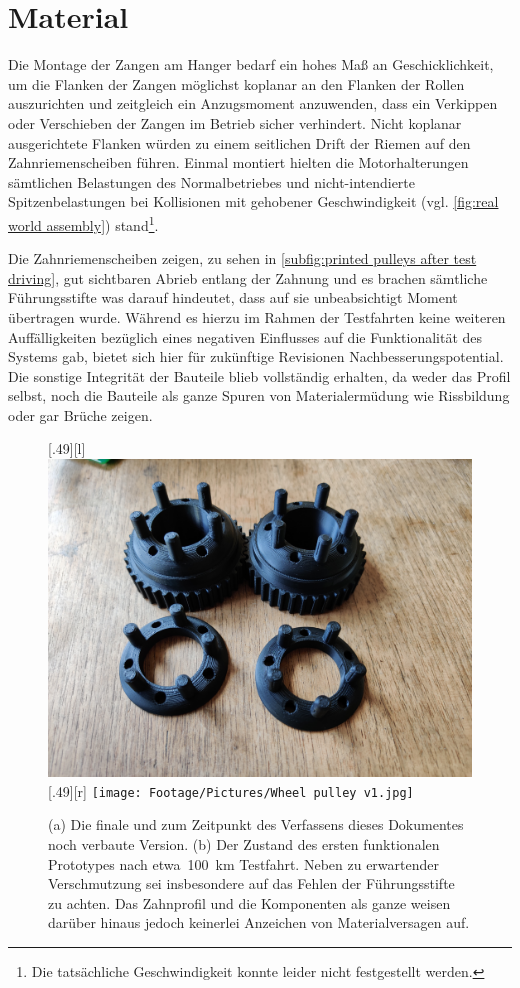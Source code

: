 	\section{Material}\label{sec:material}
		Die Montage der Zangen am Hanger bedarf ein hohes Maß an Geschicklichkeit, um die Flanken der Zangen möglichst koplanar an den Flanken der Rollen auszurichten und zeitgleich ein Anzugsmoment anzuwenden, dass ein Verkippen oder Verschieben der Zangen im Betrieb sicher verhindert.
		Nicht koplanar ausgerichtete Flanken würden zu einem seitlichen Drift der Riemen auf den Zahnriemenscheiben führen.
		Einmal montiert hielten die Motorhalterungen sämtlichen Belastungen des Normalbetriebes und nicht-intendierte Spitzenbelastungen bei Kollisionen mit gehobener Geschwindigkeit (vgl. \cref{fig:real world assembly}) stand\footnote{\hspace{1mm}Die tatsächliche Geschwindigkeit konnte leider nicht festgestellt werden.}.\par\medskip
		Die Zahnriemenscheiben zeigen, zu sehen in \cref{subfig:printed pulleys after test driving}, gut sichtbaren Abrieb entlang der Zahnung und es brachen sämtliche Führungsstifte was darauf hindeutet, dass auf sie unbeabsichtigt Moment übertragen wurde.
		Während es hierzu im Rahmen der Testfahrten keine weiteren Auffälligkeiten bezüglich eines negativen Einflusses auf die Funktionalität des Systems gab, bietet sich hier für zukünftige Revisionen Nachbesserungspotential.
		Die sonstige Integrität der Bauteile blieb vollständig erhalten, da weder das Profil selbst, noch die Bauteile als ganze Spuren von Materialermüdung wie Rissbildung oder gar Brüche zeigen.
		\begin{figure}[h]
			\centering
			[.49\textwidth][l]{
				\includegraphics[angle=180, width=.49\textwidth]{Footage/Pictures/Wheel pulley v2.jpg}
			}
			[.49\textwidth][r]{
				\texttt{[image: Footage/Pictures/Wheel pulley v1.jpg]}
			}
			\caption[Vergleich der gedruckten Zahn- und Konterscheiben vor und nach mehreren Testfahrten]{(a) Die finale und zum Zeitpunkt des Verfassens dieses Dokumentes noch verbaute Version. (b) Der Zustand des ersten funktionalen Prototypes nach etwa~\qty{100}{\kilo\metre} Testfahrt. Neben zu erwartender Verschmutzung sei insbesondere auf das Fehlen der Führungsstifte zu achten. Das Zahnprofil und die Komponenten als ganze weisen darüber hinaus jedoch keinerlei Anzeichen von Materialversagen auf.}
			\label{fig:comparison printed parts used unused}
		\end{figure}


